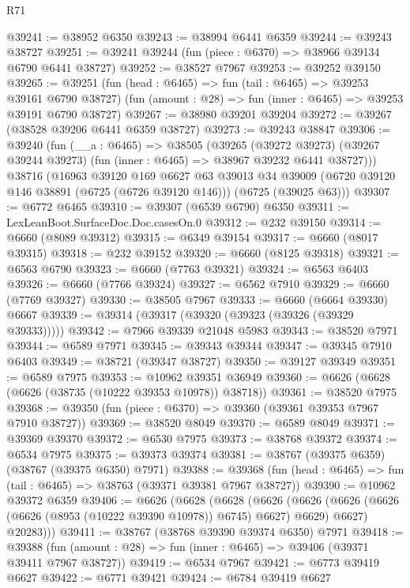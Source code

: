 \begin{lexlean}{R71}
\begin{coremodule}
@39241 := @38952 @6350
@39243 := @38994 @6441 @6359
@39244 := @39243 @38727
@39251 := @39241 @39244 (fun (piece : @6370) => @38966 @39134 @6790 @6441 @38727)
@39252 := @38527 @7967
@39253 := @39252 @39150
@39265 := @39251
    (fun (head : @6465) => fun (tail : @6465) => @39253 @39161 @6790 @38727)
    (fun (amount : @28) => fun (inner : @6465) => @39253 @39191 @6790 @38727)
@39267 := @38980 @39201 @39204
@39272 := @39267 (@38528 @39206 @6441 @6359 @38727)
@39273 := @39243 @38847
@39306 := @39240
    (fun (__a : @6465) =>
    @38505
      (@39265
        (@39272 @39273)
        (@39267 @39244 @39273)
        (fun (inner : @6465) => @38967 @39232 @6441 @38727)))
    @38716
    (@16963
      @39120
      @169
      @6627
      @63
      @39013
      @34
      @39009
      (@6720 @39120 @146 @38891 (@6725 (@6726 @39120 @146)))
      (@6725 (@39025 @63)))
@39307 := @6772 @6465
@39310 := @39307 (@6539 @6790) @6350
@39311 := LexLeanBoot.SurfaceDoc.Doc.casesOn.{0}
@39312 := @232 @39150
@39314 := @6660 (@8089 @39312)
@39315 := @6349 @39154
@39317 := @6660 (@8017 @39315)
@39318 := @232 @39152
@39320 := @6660 (@8125 @39318)
@39321 := @6563 @6790
@39323 := @6660 (@7763 @39321)
@39324 := @6563 @6403
@39326 := @6660 (@7766 @39324)
@39327 := @6562 @7910
@39329 := @6660 (@7769 @39327)
@39330 := @38505 @7967
@39333 := @6660 (@6664 @39330) @6667
@39339 := @39314 (@39317 (@39320 (@39323 (@39326 (@39329 @39333)))))
@39342 := @7966 @39339 @21048 @5983
@39343 := @38520 @7971
@39344 := @6589 @7971
@39345 := @39343 @39344
@39347 := @39345 @7910 @6403
@39349 := @38721 (@39347 @38727)
@39350 := @39127 @39349
@39351 := @6589 @7975
@39353 := @10962 @39351 @36949
@39360 := @6626 (@6628 (@6626 (@38735 (@10222 @39353 @10978)) @38718))
@39361 := @38520 @7975
@39368 := @39350 (fun (piece : @6370) => @39360 (@39361 @39353 @7967 @7910 @38727))
@39369 := @38520 @8049
@39370 := @6589 @8049
@39371 := @39369 @39370
@39372 := @6530 @7975
@39373 := @38768 @39372
@39374 := @6534 @7975
@39375 := @39373 @39374
@39381 := @38767 (@39375 @6359) (@38767 (@39375 @6350) @7971)
@39388 := @39368 (fun (head : @6465) => fun (tail : @6465) => @38763 (@39371 @39381 @7967 @38727))
@39390 := @10962 @39372 @6359
@39406 := @6626
    (@6628
      (@6628
        (@6626
          (@6626 (@6626 (@6626 (@6626 (@8953 (@10222 @39390 @10978)) @6745) @6627) @6629) @6627)
          @20283)))
@39411 := @38767 (@38768 @39390 @39374 @6350) @7971
@39418 := @39388 (fun (amount : @28) => fun (inner : @6465) => @39406 (@39371 @39411 @7967 @38727))
@39419 := @6534 @7967
@39421 := @6773 @39419 @6627
@39422 := @6771 @39421
@39424 := @6784 @39419 @6627

\end{coremodule}
\end{lexlean}

